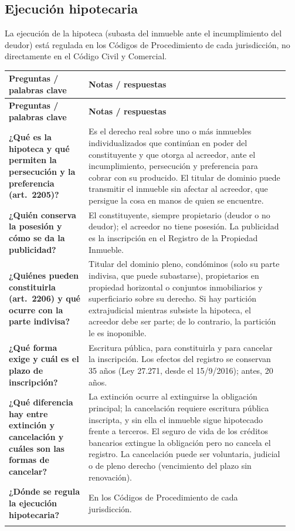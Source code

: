 \documentclass[12pt,oneside]{book}
\makeatletter
\newenvironment{cornell}{%
    \par\vspace{0.5em}
    \noindent
    \begin{longtable}{@{}>{\raggedright\arraybackslash}p{0.27\linewidth}
                         >{\raggedright\arraybackslash}p{0.68\linewidth}@{}}
    \toprule
    \textbf{Preguntas / palabras clave} & \textbf{Notas / respuestas} \\
    \midrule
    \endfirsthead
    \toprule
    \textbf{Preguntas / palabras clave} & \textbf{Notas / respuestas} \\
    \midrule
    \endhead
}{%
    \bottomrule
    \end{longtable}
}
\newcommand{\cornellsummary}[1]{%
    \midrule
    \multicolumn{2}{@{}p{\dimexpr0.95\linewidth+2\tabcolsep\relax}@{}}{%
        \vspace{0.2em}\textbf{Resumen:} #1\vspace{0.2em}} \\
}
\makeatother
\begin{document}
\subsection{Ejecución hipotecaria}

La ejecución de la hipoteca (subasta del inmueble ante el incumplimiento del deudor) está regulada en los Códigos de Procedimiento de cada jurisdicción, no directamente en el Código Civil y Comercial.

\begin{cornell}
\textbf{¿Qué es la hipoteca y qué permiten la persecución y la preferencia (art.~2205)?} &
Es el derecho real sobre uno o más inmuebles individualizados que continúan en poder del constituyente y que otorga al acreedor, ante el incumplimiento, persecución y preferencia para cobrar con su producido. El titular de dominio puede transmitir el inmueble sin afectar al acreedor, que persigue la cosa en manos de quien se encuentre. \\

\textbf{¿Quién conserva la posesión y cómo se da la publicidad?} &
El constituyente, siempre propietario (deudor o no deudor); el acreedor no tiene posesión. La publicidad es la inscripción en el Registro de la Propiedad Inmueble. \\

\textbf{¿Quiénes pueden constituirla (art.~2206) y qué ocurre con la parte indivisa?} &
Titular del dominio pleno, condóminos (solo su parte indivisa, que puede subastarse), propietarios en propiedad horizontal o conjuntos inmobiliarios y superficiario sobre su derecho. Si hay partición extrajudicial mientras subsiste la hipoteca, el acreedor debe ser parte; de lo contrario, la partición le es inoponible. \\

\textbf{¿Qué forma exige y cuál es el plazo de inscripción?} &
Escritura pública, para constituirla y para cancelar la inscripción. Los efectos del registro se conservan 35 años (Ley 27.271, desde el 15/9/2016); antes, 20 años. \\

\textbf{¿Qué diferencia hay entre extinción y cancelación y cuáles son las formas de cancelar?} &
La extinción ocurre al extinguirse la obligación principal; la cancelación requiere escritura pública inscripta, y sin ella el inmueble sigue hipotecado frente a terceros. El seguro de vida de los créditos bancarios extingue la obligación pero no cancela el registro. La cancelación puede ser voluntaria, judicial o de pleno derecho (vencimiento del plazo sin renovación). \\

\textbf{¿Dónde se regula la ejecución hipotecaria?} &
En los Códigos de Procedimiento de cada jurisdicción. \\

\cornellsummary{La hipoteca opera sobre inmuebles sin desplazamiento posesorio, otorga persecución y preferencia y da publicidad a través del Registro de la Propiedad Inmueble. Se constituye por escritura pública, sus efectos registrales se conservan por 35 años y debe distinguirse la extinción de la cancelación, pues la primera no implica automáticamente la segunda.}
\end{cornell}
\end{document}
